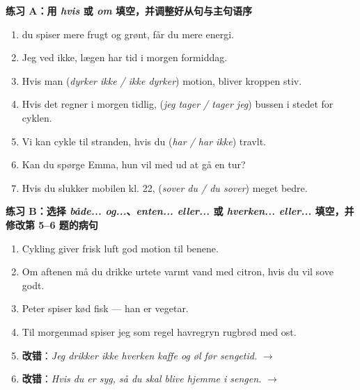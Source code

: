 
\textbf{练习 A：用 \textit{hvis} 或 \textit{om} 填空，并调整好从句与主句语序}
\begin{enumerate}
  \item \underline{\hspace{1.4cm}} du spiser mere frugt og grønt, får du mere energi.
  \item Jeg ved ikke, \underline{\hspace{1.4cm}} lægen har tid i morgen formiddag.
  \item Hvis man \underline{\hspace{2.8cm}} (\textit{dyrker ikke / ikke dyrker}) motion, bliver kroppen stiv.
  \item Hvis det regner i morgen tidlig, \underline{\hspace{2.4cm}} (\textit{jeg tager / tager jeg}) bussen i stedet for cyklen.
  \item Vi kan cykle til stranden, hvis du \underline{\hspace{2.4cm}} (\textit{har / har ikke}) travlt.
  \item Kan du spørge Emma, \underline{\hspace{1.4cm}} hun vil med ud at gå en tur?
  \item Hvis du slukker mobilen kl. 22, \underline{\hspace{2.4cm}} (\textit{sover du / du sover}) meget bedre.
\end{enumerate}

\textbf{练习 B：选择 \textit{både... og...}、\textit{enten... eller...} 或 \textit{hverken... eller...} 填空，并修改第 5--6 题的病句}
\begin{enumerate}
  \item Cykling giver \underline{\hspace{1.5cm}} frisk luft \underline{\hspace{1.5cm}} god motion til benene.
  \item Om aftenen må du drikke \underline{\hspace{1.5cm}} urtete \underline{\hspace{1.5cm}} varmt vand med citron, hvis du vil sove godt.
  \item Peter spiser \underline{\hspace{1.5cm}} kød \underline{\hspace{1.5cm}} fisk --- han er vegetar.
  \item Til morgenmad spiser jeg som regel \underline{\hspace{1.5cm}} havregryn \underline{\hspace{1.5cm}} rugbrød med ost.
  \item \textbf{改错}：\textit{Jeg drikker ikke hverken kaffe og øl før sengetid.} $\rightarrow$
  \item \textbf{改错}：\textit{Hvis du er syg, så du skal blive hjemme i sengen.} $\rightarrow$
\end{enumerate}

